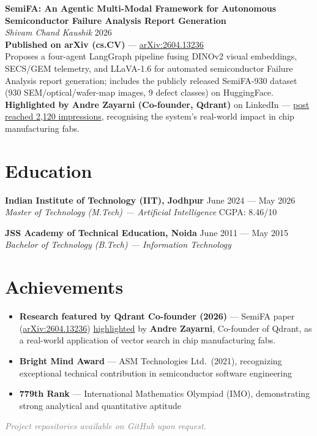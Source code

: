 \documentclass[11pt,a4paper]{article}
\begin{document}
\noindent\textbf{SemiFA: An Agentic Multi-Modal Framework for Autonomous Semiconductor Failure Analysis Report Generation}\\
\textit{Shivam Chand Kaushik} \hfill 2026\\
\textbf{Published on arXiv (cs.CV)} --- \href{https://arxiv.org/abs/2604.13236}{arXiv:2604.13236}\\
Proposes a four-agent LangGraph pipeline fusing DINOv2 visual embeddings, SECS/GEM telemetry, and LLaVA-1.6 for automated semiconductor Failure Analysis report generation; includes the publicly released SemiFA-930 dataset (930 SEM/optical/wafer-map images, 9 defect classes) on HuggingFace.\\
\textcolor{accent}{\textbf{Highlighted by Andre Zayarni (Co-founder, Qdrant)}} on LinkedIn --- \href{https://lnkd.in/gpwVj8P8}{post reached 2,120 impressions}, recognising the system's real-world impact in chip manufacturing fabs.

\section{Education}

\noindent\textbf{Indian Institute of Technology (IIT), Jodhpur} \hfill June 2024 --- May 2026\\
\textit{Master of Technology (M.Tech) --- Artificial Intelligence} \hfill CGPA: 8.46/10

\noindent\textbf{JSS Academy of Technical Education, Noida} \hfill June 2011 --- May 2015\\
\textit{Bachelor of Technology (B.Tech) --- Information Technology}

\section{Achievements}
\begin{itemize}[leftmargin=*, nosep, topsep=2pt]
    \item \textbf{Research featured by Qdrant Co-founder (2026)} --- SemiFA paper (\href{https://arxiv.org/abs/2604.13236}{arXiv:2604.13236}) \href{https://lnkd.in/gpwVj8P8}{highlighted} by \textbf{Andre Zayarni}, Co-founder of Qdrant, as a real-world application of vector search in chip manufacturing fabs.
    \item \textbf{Bright Mind Award} --- ASM Technologies Ltd.\ (2021), recognizing exceptional technical contribution in semiconductor software engineering
    \item \textbf{779th Rank} --- International Mathematics Olympiad (IMO), demonstrating strong analytical and quantitative aptitude
\end{itemize}

\vfill
\begin{center}
    \textcolor{graytext}{\textit{Project repositories available on GitHub upon request.}}
\end{center}
\end{document}
